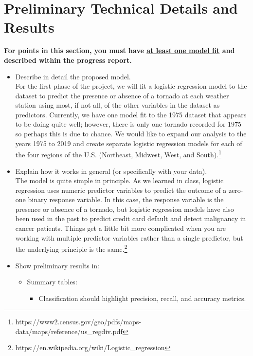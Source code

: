 \documentclass[conference]{IEEEtran}
\begin{document}
\section{Preliminary Technical Details and Results}

\textbf{For points in this section, you must have \underline{at least one model fit} and described within the progress report.}

\begin{itemize}
  \item Describe in detail the proposed model. \\

  For the first phase of the project, we will fit a logistic regression model to the dataset to predict the presence or absence of a tornado at each weather station using most, if not all, of the other variables in the dataset as predictors. Currently, we have one model fit to the 1975 dataset that appears to be doing quite well; however, there is only one tornado recorded for 1975 so perhaps this is due to chance. We would like to expand our analysis to the years 1975 to 2019 and create separate logistic regression models for each of the four regions of the U.S. (Northeast, Midwest, West, and South).\footnote{https://www2.census.gov/geo/pdfs/maps-data/maps/reference/us\_regdiv.pdf} \\

  \item Explain how it works in general (or specifically with your data). \\

  The model is quite simple in principle. As we learned in class, logistic regression uses numeric predictor variables to predict the outcome of a zero-one binary response variable. In this case, the response variable is the presence or absence of a tornado, but logistic regression  models have also been used in the past to predict credit card default and detect malignancy in cancer patients. Things get a little bit more complicated when you are working with multiple predictor variables rather than a single predictor, but the underlying principle is the same.\footnote{https://en.wikipedia.org/wiki/Logistic\_regression} \\

  \item Show preliminary results in:
  \begin{itemize}
    \item Summary tables:
    \begin{itemize}
      \item Classification should highlight precision, recall, and accuracy metrics. \\


\end{itemize}
\end{itemize}
\end{itemize}
\end{document}
